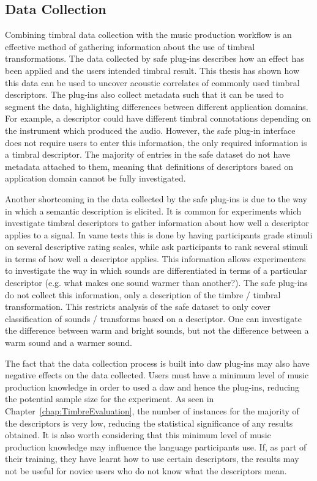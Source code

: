 	\subsection{Data Collection}
	\label{sec:Conclusion-Critique-DataCollection}
		Combining timbral data collection with the music production workflow is an effective method of gathering
		information about the use of timbral transformations. The data collected by \acrshort{safe} plug-ins
		describes how an effect has been applied and the users intended timbral result. This thesis has shown how
		this data can be used to uncover acoustic correlates of commonly used timbral descriptors. The plug-ins also
		collect metadata such that it can be used to segment the data, highlighting differences between different
		application domains. For example, a descriptor could have different timbral connotations depending on the
		instrument which produced the audio. However, the \acrshort{safe} plug-in interface does not require users
		to enter this information, the only required information is a timbral descriptor. The majority of entries in
		the \acrshort{safe} dataset do not have metadata attached to them, meaning that definitions of descriptors
		based on application domain cannot be fully investigated. 

		Another shortcoming in the data collected by the \acrshort{safe} plug-ins is due to the way in which a
		semantic description is elicited. It is common for experiments which investigate timbral descriptors to
		gather information about how well a descriptor applies to a signal. In \acrshort{vame} tests this is done by
		having participants grade stimuli on several descriptive rating scales, while \citet{cartwright2013socialeq}
		ask participants to rank several stimuli in terms of how well a descriptor applies. This information allows
		experimenters to investigate the way in which sounds are differentiated in terms of a particular descriptor
		(e.g. what makes one sound warmer than another?). The \acrshort{safe} plug-ins do not collect this
		information, only a description of the timbre / timbral transformation. This restricts analysis of the
		\acrshort{safe} dataset to only cover classification of sounds / transforms based on a descriptor. One can
		investigate the difference between warm and bright sounds, but not the difference between a warm sound and a
		warmer sound.

		The fact that the data collection process is built into \acrshort{daw} plug-ins may also have negative
		effects on the data collected. Users must have a minimum level of music production knowledge in order to
		used a \acrshort{daw} and hence the plug-ins, reducing the potential sample size for the experiment. As seen
		in Chapter~\ref{chap:TimbreEvaluation}, the number of instances for the majority of the descriptors is very
		low, reducing the statistical significance of any results obtained. It is also worth considering that this
		minimum level of music production knowledge may influence the language participants use. If, as part of
		their training, they have learnt how to use certain descriptors, the results may not be useful for novice
		users who do not know what the descriptors mean.

